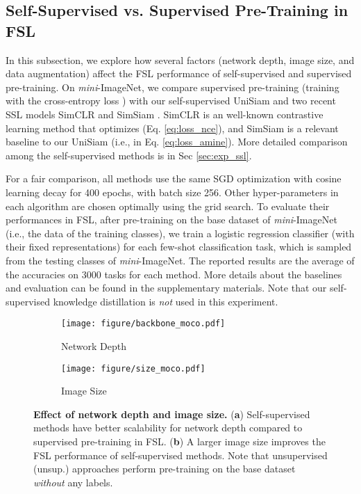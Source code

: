 \documentclass[runningheads]{llncs}
\begin{document}
\subsection{Self-Supervised vs. Supervised Pre-Training in FSL}
\label{sec:sup}
In this subsection, we explore how several factors (network depth, image size, and data augmentation) affect the FSL performance of self-supervised and supervised pre-training. On \emph{mini}-ImageNet, we compare supervised pre-training (training with the cross-entropy loss \cite{tian2020rethinking}) with our self-supervised UniSiam and two recent SSL models SimCLR \cite{chen2020a} and SimSiam \cite{chen2020exploring}. 
SimCLR is an well-known contrastive learning method that optimizes  (Eq. \ref{eq:loss_nce}), and SimSiam is a relevant baseline to our UniSiam (i.e.,  in Eq. \ref{eq:loss_amine}).
More detailed comparison among the self-supervised methods is in Sec \ref{sec:exp_ssl}.

For a fair comparison, all methods use the same SGD optimization with cosine learning decay for 400 epochs, with batch size 256.
Other hyper-parameters in each algorithm are chosen optimally using the grid search. 
To evaluate their performances in FSL, after pre-training on the base dataset of \emph{mini}-ImageNet (i.e., the data of the training classes), we train a logistic regression classifier (with their fixed representations) for each few-shot classification task, which is sampled from the testing classes of \emph{mini}-ImageNet.  
The reported results are the average of the accuracies on 3000 tasks for each method. 
More details about the baselines and evaluation can be found in the supplementary materials.
Note that our self-supervised knowledge distillation is \textit{not} used in this experiment. 

\begin{figure}[tbp]
\centering
	\begin{subfigure}[t]{0.4\linewidth} 
	    \centering
        \texttt{[image: figure/backbone\_moco.pdf]}
		\caption{Network Depth} 
		\label{fig:bb}
	\end{subfigure}
	\hfill
	\begin{subfigure}[t]{0.4\linewidth}
	    \centering
        \texttt{[image: figure/size\_moco.pdf]}
		\caption{Image Size} 
			\label{fig:size}
	\end{subfigure}
	\caption{\textbf{Effect of network depth and image size.} (\textbf{a}) Self-supervised methods have better scalability for network depth compared to supervised pre-training in FSL. (\textbf{b}) A larger image size improves the FSL performance of self-supervised methods. Note that unsupervised (unsup.) approaches perform pre-training on the base dataset \emph{without} any labels.} 
	\label{fig:bb_and_size}
\end{figure}
\end{document}
